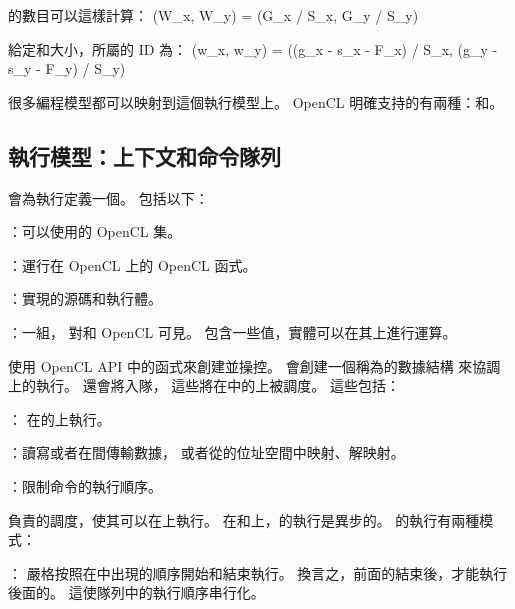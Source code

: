 的數目可以這樣計算：
\startformula
(W_x, W_y) = (G_x / S_x, G_y / S_y)
\stopformula

給定和大小，所屬的 ID 為：
\startformula
(w_x, w_y) = ((g_x - s_x - F_x) / S_x, (g_y - s_y - F_y) / S_y)
\stopformula


{}

很多編程模型都可以映射到這個執行模型上。
OpenCL 明確支持的有兩種：和。

\subsection[sec:exemodel:contextandcmdq]{執行模型：上下文和命令隊列}

會為執行定義一個。
包括以下：
\startigNum
\item {}：可以使用的 OpenCL 集。
\item {}：運行在 OpenCL 上的 OpenCL 函式。
\item {}：實現的源碼和執行體。
\item {}：一組，
對和 OpenCL 可見。
包含一些值，實體可以在其上進行運算。
\stopigBase

使用 OpenCL API 中的函式來創建並操控。
會創建一個稱為的數據結構
來協調上的執行。
還會將入隊，
這些將在中的上被調度。
這些包括：
\startigBase
\item {}：
在的上執行。

\item {}：讀寫或者在間傳輸數據，
或者從的位址空間中映射、解映射。

\item {}：限制命令的執行順序。
\stopigBase

負責的調度，使其可以在上執行。
在和上，的執行是異步的。
的執行有兩種模式：
\startigBase
\item {}：
嚴格按照在中出現的順序開始和結束執行。
換言之，前面的結束後，才能執行後面的。
這使隊列中的執行順序串行化。

